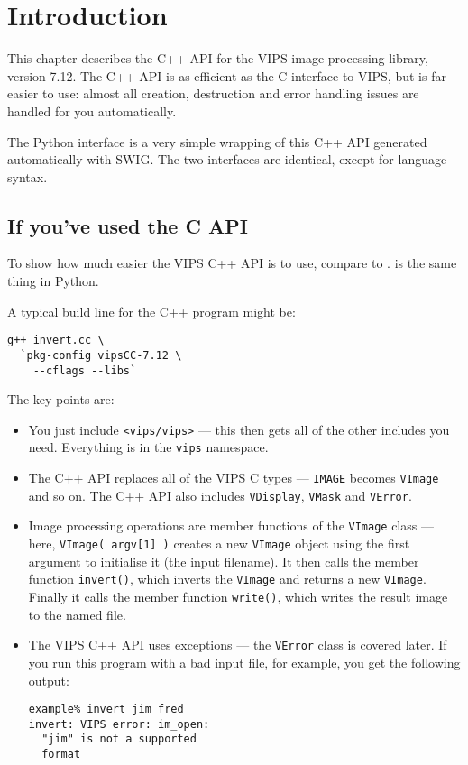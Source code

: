 \section{Introduction}

This chapter describes the C++ API for the VIPS image processing library,
version 7.12. The C++ API is as efficient as the C interface to VIPS, but is
far easier to use: almost all creation, destruction and error handling issues
are handled for you automatically.

The Python interface is a very simple wrapping of this C++ API generated
automatically with SWIG. The two interfaces are identical, except for language
syntax.

\subsection{If you've used the C API}

To show how much easier the VIPS C++ API is to use, compare 
to .  is the same thing in Python.

A typical build line for the C++ program might be:

\begin{verbatim}
g++ invert.cc \
  `pkg-config vipsCC-7.12 \
    --cflags --libs` 
\end{verbatim}

The key points are:

\begin{itemize}

\item
You just include \verb+<vips/vips>+ --- this then gets all of the
other includes you need. Everything is in the \verb+vips+ namespace.

\item
The C++ API replaces all of the VIPS C types --- \verb+IMAGE+ becomes
\verb+VImage+ and so on. The C++ API also includes \verb+VDisplay+,
\verb+VMask+ and \verb+VError+.

\item
Image processing operations are member functions of the \verb+VImage+ class
--- here, \verb+VImage( argv[1] )+ creates a new \verb+VImage+ object using
the first argument to initialise it (the input filename). It then calls the
member function \verb+invert()+, which inverts the \verb+VImage+ and returns a
new \verb+VImage+.  Finally it calls the member function \verb+write()+, which
writes the result image to the named file.

\item
The VIPS C++ API uses exceptions --- the \verb+VError+ class is covered
later. If you run this program with a bad input file, for example, you get the
following output:

\begin{verbatim}
example% invert jim fred
invert: VIPS error: im_open: 
  "jim" is not a supported 
  format
\end{verbatim}

\end{itemize}

